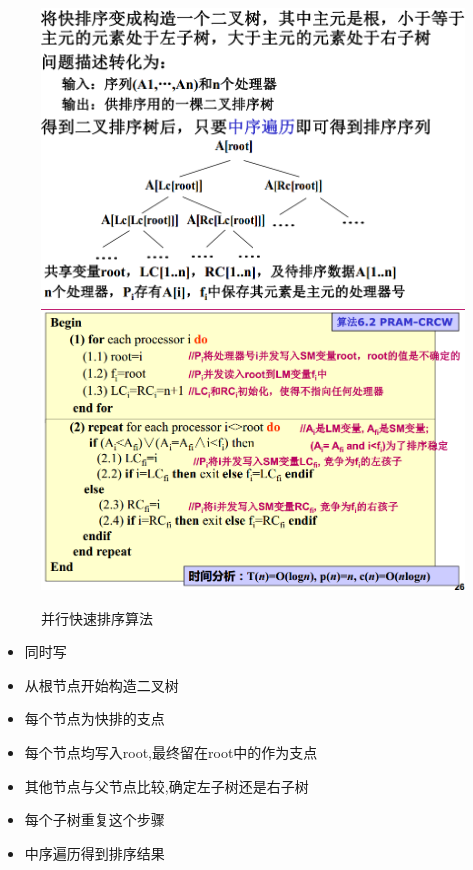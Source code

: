 \documentclass[UTF8,a4paper]{ctexart}
\begin{document}
  \begin{figure}[H]
    \centering
    \includegraphics[scale = 0.3]{assets/ParallelComputing_1d815.png}
    \includegraphics[scale = 0.3]{assets/ParallelComputing_e897a.png}
    \caption{并行快速排序算法}
  \end{figure}

  \begin{itemize}
    \item 同时写
    \item 从根节点开始构造二叉树
    \item 每个节点为快排的支点
    \item 每个节点均写入root,最终留在root中的作为支点
    \item 其他节点与父节点比较,确定左子树还是右子树
    \item 每个子树重复这个步骤
    \item 中序遍历得到排序结果
  \end{itemize}
\end{document}
